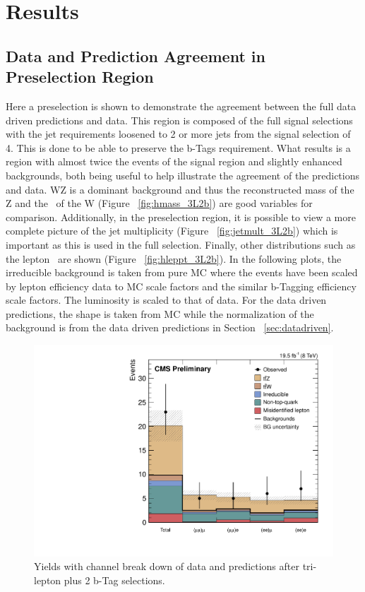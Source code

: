\chapter{Results}
         \section{Data and Prediction Agreement in Preselection Region}
         Here a preselection is shown to demonstrate the agreement between the full data driven predictions and data. This region is composed of the full signal selections with the jet requirements loosened to 2 or more jets from the signal selection of 4. This is done to be able to preserve the b-Tags requirement. What results is a region with almost twice the events of the signal region and slightly enhanced backgrounds, both being useful to help illustrate the agreement of the predictions and data. WZ is a dominant background and thus the reconstructed mass of the Z and the \Mt \ of the W (Figure ~\ref{fig:hmass_3L2b}) are good variables for comparison. Additionally, in the preselection region, it is possible to view a more complete picture of the jet multiplicity (Figure ~\ref{fig:jetmult_3L2b}) which is important as this is used in the full selection. Finally, other distributions such as the lepton \pt \ are shown (Figure ~\ref{fig:hleppt_3L2b}). In the following plots, the irreducible background is taken from pure MC where the events have been scaled by lepton efficiency data to MC scale factors and the similar b-Tagging efficiency scale factors. The luminosity is scaled to that of data. For the data driven predictions, the shape is taken from MC while the normalization of the background is from the data driven predictions in Section ~\ref{sec:datadriven}.

\begin{figure}[h]
\begin{center}
\includegraphics[width=0.48\linewidth]{Figs/Plots_PreSelections/hYields_3L2b.pdf}
\caption{\label{fig:hyields_3L2b}
Yields with channel break down of data and predictions after tri-lepton plus 2 b-Tag selections.
}
\end{center}
\end{figure}

